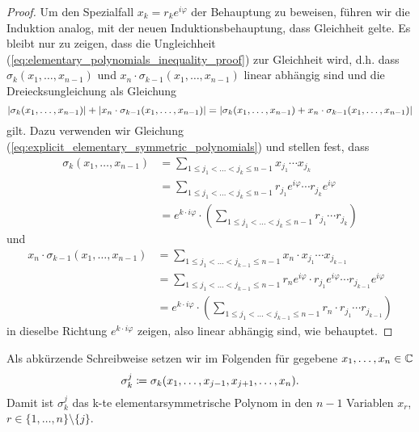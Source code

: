 \begin{proof}
    Um den Spezialfall $x_k = r_k e^{i \varphi}$ der Behauptung zu beweisen,
    führen wir die Induktion analog, mit der neuen Induktionsbehauptung, dass
    Gleichheit gelte.  Es bleibt nur zu zeigen, dass die Ungleichheit
    (\ref{eq:elementary_polynomials_inequality_proof}) zur Gleichheit wird, d.h. dass
    $\sigma_{k}(x_1, \dots, x_{n-1})$ und $x_n \cdot \sigma_{k-1}(x_1, \dots, x_{n-1})$
    linear abhängig sind und die Dreiecksungleichung als Gleichung
    \[
        \left\lvert \sigma_{k}(x_1, \dots, x_{n-1}) \right\rvert + \left\lvert x_n \cdot \sigma_{k-1}(x_1, \dots, x_{n-1}) \right\rvert
        = \left\lvert \sigma_{k}(x_1, \dots, x_{n-1}) + x_n \cdot \sigma_{k-1}(x_1, \dots, x_{n-1}) \right\rvert
    \]
    gilt.
    Dazu verwenden wir Gleichung
    (\ref{eq:explicit_elementary_symmetric_polynomials}) und stellen fest, dass
    \begin{equation*}
        \begin{split}
            \sigma_{k}(x_1, \dots, x_{n-1})
            &= \sum_{1 \leq j_1 < \dots < j_k \leq n-1} x_{j_1} \cdots x_{j_k}\\
            &= \sum_{1 \leq j_1 < \dots < j_k \leq n-1} r_{j_1} e^{i\varphi} \cdots r_{j_k} e^{i\varphi}\\
            &= e^{k\cdot i\varphi} \cdot \left( \sum_{1 \leq j_1 < \dots < j_k \leq n-1} r_{j_1} \cdots r_{j_k} \right)
        \end{split}
    \end{equation*}
    und
    \begin{equation*}
        \begin{split}
            x_n \cdot \sigma_{k-1}(x_1, \dots, x_{n-1})
            &= \sum_{1 \leq j_1 < \dots < j_{k-1} \leq n-1} x_n \cdot x_{j_1} \cdots x_{j_{k-1}}\\
            &= \sum_{1 \leq j_1 < \dots < j_{k-1} \leq n-1} r_n e^{i\varphi} \cdot r_{j_1} e^{i\varphi} \cdots r_{j_{k-1}} e^{i\varphi}\\
            &= e^{k\cdot i\varphi} \cdot \left( \sum_{1 \leq j_1 < \dots < j_{k-1} \leq n-1} r_n \cdot r_{j_1} \cdots r_{j_{k-1}} \right)
        \end{split}
    \end{equation*}
    in dieselbe Richtung $e^{k\cdot i\varphi}$ zeigen, also linear abhängig sind, wie behauptet.
\end{proof}

\begin{notation}
    Als abkürzende Schreibweise setzen wir im Folgenden für gegebene $x_1, \dots, x_{n} \in \mathbb{C}$
    \[
        \sigma_{k}^{j} \coloneqq \sigma_{k}(x_1, \dots, x_{j-1}, x_{j+1}, \dots, x_{n}).
    \]
    Damit ist $\sigma_{k}^{j}$ das k-te elementarsymmetrische Polynom in den
    $n-1$ Variablen $x_r$, $r \in \{ 1, \dots, n \} \setminus \{ j \}$.
\end{notation}

